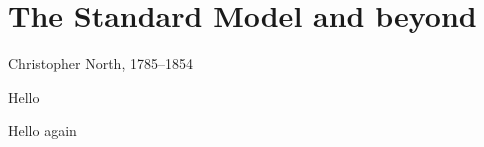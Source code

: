\chapter{The Standard Model and beyond}
\label{chapter:theory}

%
{Christopher North, 1785--1854}%

Hello


\clearpage

Hello again
